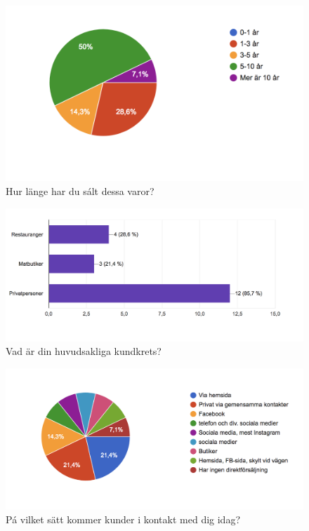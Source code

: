 \documentclass[10pt,a4paper,oneside]{article}
\begin{document}
\begin{figure}
	\includegraphics[scale=0.6]{2.png}
	\caption{Hur l\"ange har du s\'alt dessa varor?}
\end{figure}

\begin{figure}
	\includegraphics[scale=0.6]{3.png}
	\caption{Vad \"ar din huvudsakliga kundkrets?}
\end{figure}

\begin{figure}
	\includegraphics[scale=0.6]{4.png}
	\caption{P\'a vilket s\"att kommer kunder i kontakt med dig idag?}
\end{figure}
\end{document}
